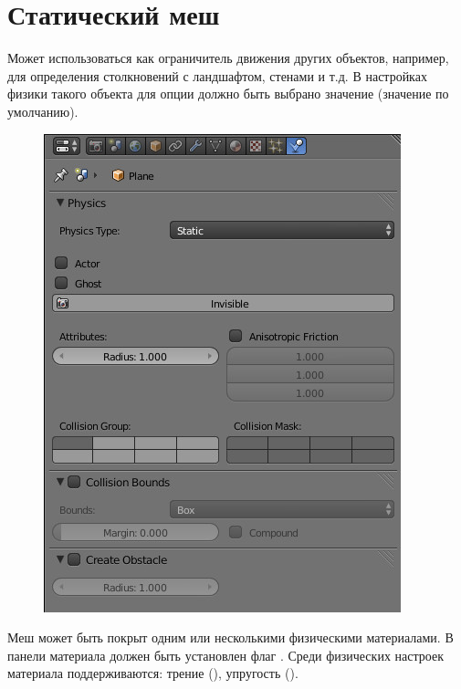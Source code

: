 \documentclass[a4paper,12pt,oneside]{sphinxmanual}
\begin{document}
\section{Статический меш}
\label{physics:id3}
Может использоваться как ограничитель движения других объектов, например, для определения столкновений с ландшафтом, стенами и т.д. В настройках физики такого объекта для опции  должно быть выбрано значение  (значение по умолчанию).
\begin{figure}[htbp]
\centering

\includegraphics[width=0.800\linewidth]{physics_panel_static.jpg}
\end{figure}

\begin{DUlineblock}{0em}
\item[] 
\end{DUlineblock}

Меш может быть покрыт одним или несколькими физическими материалами. В панели материала должен быть установлен флаг . Среди физических настроек материала поддерживаются: трение (), упругость ().
\end{document}
